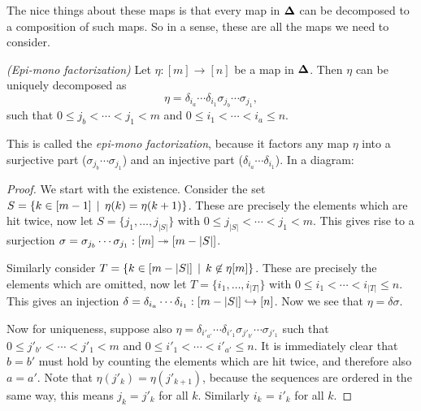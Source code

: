 The nice things about these maps is that every map in $\mathbf{\Delta}$ can be decomposed to a composition of such maps. So in a sense, these are all the maps we need to consider.

\begin{lemma}\emph{(Epi-mono factorization)}
	\label{le:epimono}
	Let $\eta : [m] \to [n]$ be a map in $\mathbf{\Delta}$. Then $\eta$ can be uniquely decomposed as
	$$ \eta = \delta_{i_a} \cdots \delta_{i_1} \sigma_{j_b} \cdots \sigma_{j_1}, $$
	such that $0 \leq j_b < \cdots < j_1 < m$ and $0 \leq i_1 < \cdots < i_a \leq n$.
\end{lemma}
This is called the \emph{epi-mono factorization}, because it factors any map $\eta$ into a surjective part ($\sigma_{j_b} \cdots \sigma_{j_1}$) and an injective part ($\delta_{i_a} \cdots \delta_{i_1}$). In a diagram:

{\centering{}\par}

\begin{proof}
	We start with the existence. Consider the set $S = \{ k \in [m-1] \,\mid\, \eta(k) = \eta(k+1) \}$. These are precisely the elements which are hit twice, now let $S = \{ j_1, \ldots, j_{|S|} \}$ with $0 \leq j_{|S|} < \cdots < j_1 < m$. This gives rise to a surjection $\sigma = \sigma_{j_b} \cdots \sigma_{j_1}: [m] \twoheadrightarrow [m-|S|]$.

	Similarly consider $T = \{ k \in [m - |S|] \,\mid\, k \not \in \eta[m] \}$. These are precisely the elements which are omitted, now let $T = \{ i_1, \ldots, i_{|T|} \}$ with $0 \leq i_1 < \cdots < i_{|T|} \leq n$. This gives an injection $\delta = \delta_{i_a} \cdots \delta_{i_1} : [m - |S|] \hookrightarrow [n]$. Now we see that $\eta = \delta\sigma$.

	Now for uniqueness, suppose also $\eta = \delta_{i'_{a'}} \cdots \delta_{i'_1} \sigma_{j'_{b'}} \cdots \sigma_{j'_1}$ such that $0 \leq j'_{b'} < \cdots < j'_1 < m$ and $0 \leq i'_1 < \cdots < i'_{a'} \leq n$. It is immediately clear that $b = b'$ must hold by counting the elements which are hit twice, and therefore also $a = a'$. Note that $\eta(j'_k) = \eta(j'_{k+1})$, because the sequences are ordered in the same way, this means $j_k = j'_k$ for all $k$. Similarly $i_k$ = $i'_k$ for all $k$.
\end{proof}


